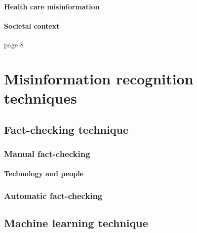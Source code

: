 \documentclass[11pt ,english,a4paper]{article}
\begin{document}
\paragraph{Health care misinformation}

\cite{wa19sys}\cite{cook15misinfo}

\paragraph{Societal context}%
\cite{who22infodemics} page 8 \cite{wa19sys}


\section{Misinformation recognition techniques} \label{tech}

\subsection{Fact-checking technique} \label{tech:fact}

\subsubsection{Manual fact-checking}\label{tech:fact:man}

\paragraph{Technology and people}%

\subsubsection{Automatic fact-checking}\label{tech:fact:auto}

\subsection{Machine learning technique} \label{tech:mach}
\end{document}
